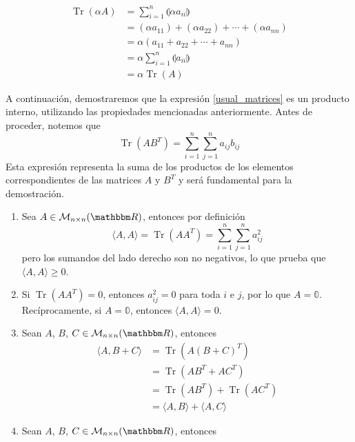 \begin{example}
\begin{enumerate}[label=\Roman*)]
        \begin{align*}
            \operatorname{Tr}(\alpha A) & = \sum_{i=1}^n \llparenthesis \alpha a_{ii} \rrparenthesis \\
            & = (\alpha a_{11}) + (\alpha a_{22}) + \cdots + (\alpha a_{nn}) \\
            & = \alpha \left( a_{11} + a_{22} + \cdots + a_{nn} \right) \\
            & = \alpha \sum_{i=1}^n \llparenthesis a_{ii} \rrparenthesis \\
            & = \alpha \operatorname{Tr}(A)
        \end{align*}
    \end{enumerate}
    A continuación, demostraremos que la expresión \eqref{usual_matrices} es un producto interno, utilizando las propiedades mencionadas anteriormente. Antes de proceder, notemos que
    $$\operatorname{Tr}\left(AB^T\right) = \sum_{i=1}^n \sum_{j=1}^n a_{ij} b_{ij}$$
    Esta expresión representa la suma de los productos de los elementos correspondientes de las matrices $A$ y $B^T$ y será fundamental para la demostración.
    \begin{enumerate}[label=\roman*)]
        \item Sea $A \in \mathcal{M}_{n \times n}(\RR)$, entonces por definición
        $$\langle A, A \rangle = \operatorname{Tr}\left(AA^T\right) = \sum_{i=1}^n \sum_{j=1}^n a_{ij}^2$$
        pero los sumandos del lado derecho son no negativos, lo que prueba que $\langle A, A \rangle \geq 0$.\newpage
        \item Si $\operatorname{Tr}\left(AA^T\right) = 0$, entonces $a_{ij}^2 = 0$ para toda $i$ e $j$, por lo que $A = \mathbb{0}$. Recíprocamente, si $A = \mathbb{0}$, entonces $\langle A, A \rangle = 0$.
        \item Sean $A$, $B$, $C \in \mathcal{M}_{n \times n}(\RR)$, entonces
        \begin{align*}
            \langle A, B + C \rangle & = \operatorname{Tr} \left( A(B + C)^T \right) \\
            & = \operatorname{Tr} \left( AB^T + AC^T \right) \\
            & = \operatorname{Tr} \left( AB^T \right) + \operatorname{Tr} \left( AC^T \right) \\
            & = \langle A, B \rangle + \langle A, C \rangle
        \end{align*}
        \item Sean $A$, $B$, $C \in \mathcal{M}_{n \times n}(\RR)$, entonces

\end{enumerate}
\end{example}
